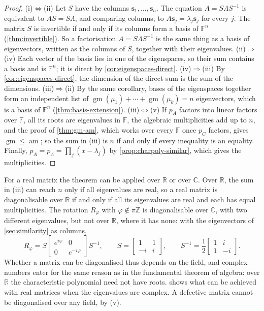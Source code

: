 \begin{proof}
(i)$\Leftrightarrow$(ii) Let $S$ have the columns $\mathbf s_1,\ldots,\mathbf s_n$. The equation $A=S\Lambda S^{-1}$ is equivalent to $AS=S\Lambda$, and comparing columns, to $A\mathbf s_j=\lambda_j\mathbf s_j$ for every $j$. The matrix $S$ is invertible if and only if its columns form a basis of $\mathbb F^n$ (\cref{thm:invertible}). So a factorisation $A=S\Lambda S^{-1}$ is the same thing as a basis of eigenvectors, written as the columns of $S$, together with their eigenvalues. (ii)$\Rightarrow$(iv) Each vector of the basis lies in one of the eigenspaces, so their sum contains a basis and is $\mathbb F^n$; it is direct by \cref{cor:eigenspaces-direct}. (iv)$\Rightarrow$(iii) By \cref{cor:eigenspaces-direct}, the dimension of the direct sum is the sum of the dimensions. (iii)$\Rightarrow$(ii) By the same corollary, bases of the eigenspaces together form an independent list of $\operatorname{gm}(\mu_1)+\cdots+\operatorname{gm}(\mu_k)=n$ eigenvectors, which is a basis of $\mathbb F^n$ (\cref{thm:basis-extension}). (iii)$\Leftrightarrow$(v) If $p_A$ factors into linear factors over $\mathbb F$, all its roots are eigenvalues in $\mathbb F$, the algebraic multiplicities add up to $n$, and the proof of \cref{thm:gm-am}, which works over every $\mathbb F$ once $p_C$ factors, gives $\operatorname{gm}\le\operatorname{am}$; so the sum in (iii) is $n$ if and only if every inequality is an equality. Finally, $p_A=p_\Lambda=\prod_j(x-\lambda_j)$ by \cref{prop:charpoly-similar}, which gives the multiplicities.
\end{proof}

For a real matrix the theorem can be applied over $\mathbb R$ or over $\mathbb C$. Over $\mathbb R$, the sum in (iii) can reach $n$ only if all eigenvalues are real, so a real matrix is diagonalisable over $\mathbb R$ if and only if all its eigenvalues are real and each has equal multiplicities. The rotation $R_\varphi$ with $\varphi\notin\pi\mathbb Z$ is diagonalisable over $\mathbb C$, with two different eigenvalues, but not over $\mathbb R$, where it has none: with the eigenvectors of \cref{sec:similarity} as columns,
\[
R_\varphi=S\begin{bmatrix}e^{i\varphi}&0\\0&e^{-i\varphi}\end{bmatrix}S^{-1},\qquad S=\begin{bmatrix}1&1\\-i&i\end{bmatrix},\qquad S^{-1}=\frac12\begin{bmatrix}1&i\\1&-i\end{bmatrix}.
\]
Whether a matrix can be diagonalised thus depends on the field, and complex numbers enter for the same reason as in the fundamental theorem of algebra: over $\mathbb R$ the characteristic polynomial need not have roots.  shows what can be achieved with real matrices when the eigenvalues are complex. A defective matrix cannot be diagonalised over any field, by (v).

